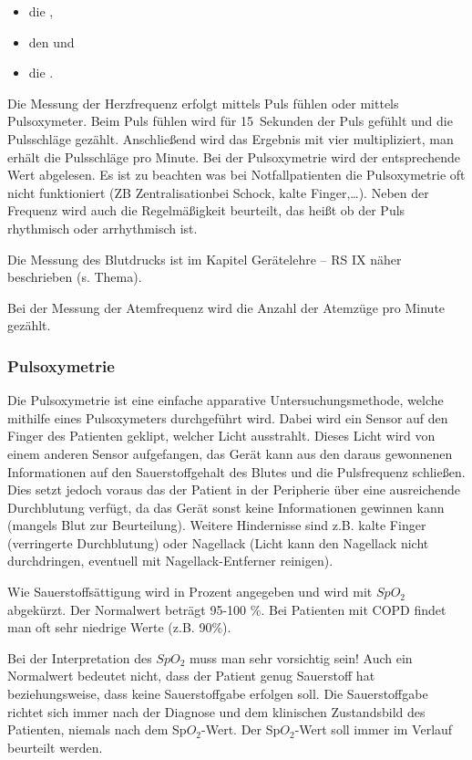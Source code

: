 \begin{itemize}
\item die , 
\item den  und 
\item die .
\end{itemize}

Die Messung der Herzfrequenz erfolgt mittels Puls fühlen oder
mittels Pulsoxymeter. Beim Puls fühlen wird für 15~Sekunden
der Puls gefühlt und die Pulsschläge gezählt. Anschließend wird
das Ergebnis mit vier multipliziert, man erhält die
Pulsschläge pro Minute. Bei der Pulsoxymetrie wird der
entsprechende Wert abgelesen. Es ist zu beachten was bei
Notfallpatienten die Pulsoxymetrie oft nicht funktioniert (ZB
Zentralisationbei Schock, kalte Finger,\ldots). Neben der
Frequenz wird auch die Regelmäßigkeit beurteilt, das heißt ob
der Puls rhythmisch oder arrhythmisch ist.

Die Messung des Blutdrucks ist im Kapitel Gerätelehre -- RS
IX näher beschrieben (s. Thema).

Bei der Messung der Atemfrequenz wird die Anzahl der Atemzüge pro Minute gezählt.


\subsubsection{Pulsoxymetrie}

Die Pulsoxymetrie ist eine einfache apparative
Untersuchungsmethode, welche mithilfe eines Pulsoxymeters
durchgeführt wird. Dabei wird ein Sensor auf den Finger des
Patienten geklipt, welcher Licht ausstrahlt. Dieses Licht
wird von einem anderen Sensor aufgefangen, das Gerät kann
aus den daraus gewonnenen Informationen auf den Sauerstoffgehalt des
Blutes und die Pulsfrequenz schließen. Dies setzt jedoch
voraus das der Patient in der Peripherie über eine
ausreichende Durchblutung verfügt, da das Gerät sonst keine
Informationen gewinnen kann (mangels Blut zur
Beurteilung). Weitere Hindernisse sind z.B. kalte
Finger (verringerte Durchblutung) oder Nagellack (Licht kann
den Nagellack nicht durchdringen, eventuell mit
Nagellack-Entferner reinigen).

Wie Sauerstoffsättigung wird in Prozent angegeben und wird
mit $SpO_2$ abgekürzt. Der Normalwert beträgt 95-100 \%. Bei
Patienten mit COPD findet man oft sehr niedrige Werte (z.B.
90\%).

Bei der Interpretation des $SpO_2$ muss man sehr
vorsichtig sein! Auch ein Normalwert bedeutet nicht, dass der Patient
genug Sauerstoff hat beziehungsweise, dass keine
Sauerstoffgabe erfolgen soll. Die Sauerstoffgabe richtet
sich immer nach der Diagnose und dem klinischen
Zustandsbild des Patienten, niemals nach dem Sp$O_2$-Wert.
Der Sp$O_2$-Wert soll immer im Verlauf beurteilt werden.

